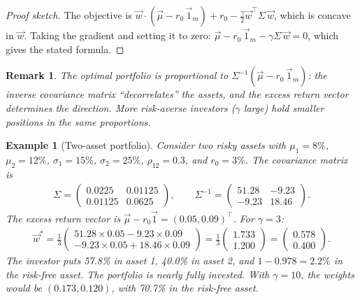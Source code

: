 \documentclass{report}
\theoremstyle{spacedplain}
\theoremstyle{spaceddefinition}
\newtheorem{example}[theorem]{Example}
\theoremstyle{spacedremark}
\newtheorem{remark}[theorem]{Remark}
\begin{document}
\begin{proof}[Proof sketch]
The objective is $\vec{w} \cdot (\vec{\mu} - r_0\,\vec{1}_m) + r_0 - \frac{\gamma}{2}\vec{w}^\top\Sigma\,\vec{w}$, which is concave in $\vec{w}$. Taking the gradient and setting it to zero: $\vec{\mu} - r_0\,\vec{1}_m - \gamma\Sigma\,\vec{w} = 0$, which gives the stated formula.
\end{proof}

\begin{remark}
The optimal portfolio is proportional to $\Sigma^{-1}(\vec{\mu} - r_0\,\vec{1}_m)$: the inverse covariance matrix ``decorrelates'' the assets, and the excess return vector determines the direction. More risk-averse investors ($\gamma$ large) hold smaller positions in the same proportions.
\end{remark}

\begin{example}[Two-asset portfolio]
Consider two risky assets with $\mu_1 = 8\%$, $\mu_2 = 12\%$, $\sigma_1 = 15\%$, $\sigma_2 = 25\%$, $\rho_{12} = 0.3$, and $r_0 = 3\%$. The covariance matrix is
\begin{align}
    \Sigma = \begin{pmatrix} 0.0225 & 0.01125 \\ 0.01125 & 0.0625 \end{pmatrix}, \qquad
    \Sigma^{-1} = \begin{pmatrix} 51.28 & -9.23 \\ -9.23 & 18.46 \end{pmatrix}.
\end{align}
The excess return vector is $\vec{\mu} - r_0\vec{1} = (0.05, 0.09)^\top$. For $\gamma = 3$:
\begin{align}
    \vec{w}^* = \frac{1}{3}\begin{pmatrix} 51.28 \times 0.05 - 9.23 \times 0.09 \\ -9.23 \times 0.05 + 18.46 \times 0.09 \end{pmatrix} = \frac{1}{3}\begin{pmatrix} 1.733 \\ 1.200 \end{pmatrix} = \begin{pmatrix} 0.578 \\ 0.400 \end{pmatrix}.
\end{align}
The investor puts 57.8\% in asset 1, 40.0\% in asset 2, and $1 - 0.978 = 2.2\%$ in the risk-free asset. The portfolio is nearly fully invested. With $\gamma = 10$, the weights would be $(0.173, 0.120)$, with 70.7\% in the risk-free asset.
\end{example}
\end{document}

